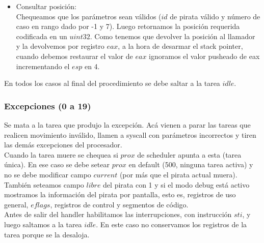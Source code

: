 \begin{itemize}
\item Consultar posición:\\
Chequeamos que los parámetros sean válidos ($id$ de pirata válido y número de caso en rango dado por -1 y 7). 
Luego retornamos la posición requerida codificada en un $uint32$. Como tenemos que devolver la posición al 
llamador y la devolvemos por registro $eax$, a la hora de desarmar el stack pointer, cuando debemos
restaurar el valor de $eax$ ignoramos el valor pusheado de eax incrementando el $esp$ en 4.
 

\end{itemize}


En todos los casos al final del procedimiento se debe saltar a la tarea $idle$.  


\subsubsection{Excepciones (0 a 19)}
Se mata a la tarea que produjo la excepción. Acá vienen a parar las tareas que realicen movimiento inválido,
llamen a syscall con parámetros incorrectos y tiren las demás excepciones del procesador.\\
Cuando la tarea muere se chequea si $prox$ de scheduler apunta a esta (tarea única). En ese 
caso se debe setear $prox$ en default (500, ninguna tarea activa) y no se debe modificar campo $current$ (por más 
que el pirata actual muera). También seteamos campo $libre$ del pirata con 1 y si el modo debug está activo 
mostramos la información del pirata por pantalla, esto es, registros de uso general, $eflags$,
registros de control y segmentos de código.\\
Antes de salir del handler habilitamos las interrupciones, con instrucción $sti$, y luego saltamos a la tarea
$idle$. En este caso no conservamos los registros de la tarea porque se la desaloja.


 

